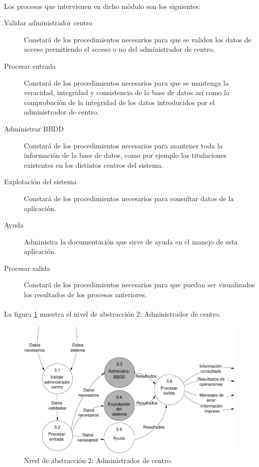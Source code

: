 \paragraph{}Los procesos que intervienen en dicho módulo son los siguientes:

\begin{description}
 \item[Validar administrador centro] Constará de los procedimientos necesarios
      para que se validen los datos de acceso permitiendo el acceso o no del
      administrador de centro.
 \item[Procesar entrada] Constará de los procedimientos necesarios para que se
      mantenga la veracidad, integridad y consistencia de la base de datos así
      como la comprobación de la integridad de los datos introducidos por el
      administrador de centro.
 \item[Administrar BBDD] Constará de los procedimientos necesarios para mantener
      toda la información de la base de datos, como por ejemplo las titulaciones
      existentes en los distintos centros del sistema.
 \item[Explotación del sistema]  Constará de los procedimientos necesarios para
      consultar datos de la aplicación.
 \item[Ayuda] Administra la documentación que sirve de ayuda en el manejo de
      esta aplicación.
 \item[Procesar salida] Constará de los procedimientos necesarios para que
      puedan ser visualizados los resultados de los procesos anteriores.
\end{description}

\paragraph{}La figura \ref{diagramaNivel2-AdmCentro} muestra el nivel de
abstracción 2: Administrador de centro.

  \begin{figure}[!ht]
    \begin{center}
      \includegraphics[]{08.Analisis_Funcional/8.2.DFDs/Niveles/Nivel2/Diagramas/nivel2-AdmCentro.pdf}
      \caption{Nivel de abstracción 2: Administrador de centro.}
      \label{diagramaNivel2-AdmCentro}
    \end{center}
  \end{figure}
